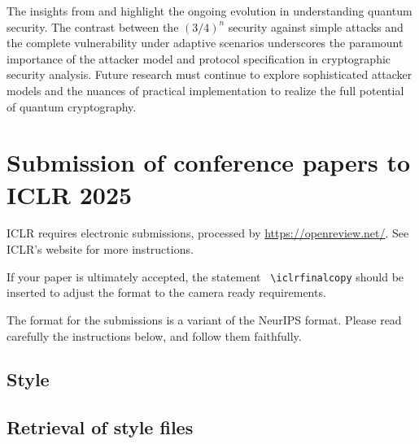 \documentclass{article} %
\begin{document}
The insights from \citet{Molina2012Optimal} and \citet{Nagaj2016Adaptive} highlight the ongoing evolution in understanding quantum security. The contrast between the $(3/4)^n$ security against simple attacks and the complete vulnerability under adaptive scenarios underscores the paramount importance of the attacker model and protocol specification in cryptographic security analysis. Future research must continue to explore sophisticated attacker models and the nuances of practical implementation to realize the full potential of quantum cryptography.


\section{Submission of conference papers to ICLR 2025}

ICLR requires electronic submissions, processed by
\url{https://openreview.net/}. See ICLR's website for more instructions.

If your paper is ultimately accepted, the statement {\tt
  {\textbackslash}iclrfinalcopy} should be inserted to adjust the
format to the camera ready requirements.

The format for the submissions is a variant of the NeurIPS format.
Please read carefully the instructions below, and follow them
faithfully.

\subsection{Style}




\subsection{Retrieval of style files}
\end{document}
